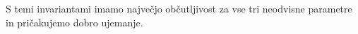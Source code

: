 S temi invariantami imamo največjo občutljivost za vse tri neodvisne parametre in pričakujemo dobro
ujemanje.


















































